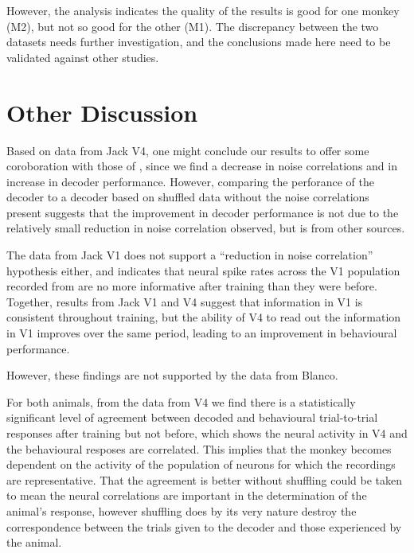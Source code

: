 However, the analysis indicates the quality of the results is good for one monkey (M2), but not so good for the other (M1). The discrepancy between the two datasets needs further investigation, and the conclusions made here need to be validated against other studies.


\clearpage
\section{Other Discussion}

Based on data from Jack V4, one might conclude our results to offer some coroboration with those of \citet{Gu2011}, since we find a decrease in noise correlations and in increase in decoder performance. However, comparing the perforance of the decoder to a decoder based on shuffled data without the noise correlations present suggests that the improvement in decoder performance is not due to the relatively small reduction in noise correlation observed, but is from other sources.

The data from Jack V1 does not support a ``reduction in noise correlation'' hypothesis either, and indicates that neural spike rates across the V1 population recorded from are no more informative after training than they were before. Together, results from Jack V1 and V4 suggest that information in V1 is consistent throughout training, but the ability of V4 to read out the information in V1 improves over the same period, leading to an improvement in behavioural performance.

However, these findings are not supported by the data from Blanco.


For both animals, from the data from V4 we find there is a statistically significant level of agreement between decoded and behavioural trial-to-trial responses after training but not before, which shows the neural activity in V4 and the behavioural resposes are correlated. This implies that the monkey becomes dependent on the activity of the population of neurons for which the recordings are representative. That the agreement is better without shuffling could be taken to mean the neural correlations are important in the determination of the animal's response, however shuffling does by its very nature destroy the correspondence between the trials given to the decoder and those experienced by the animal.
